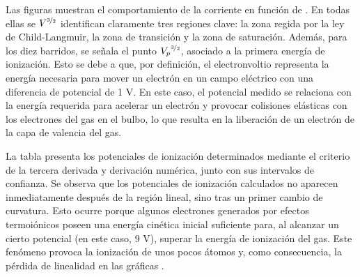 
Las figuras \ut{\ref{fig:pot1} - \ref{fig:pot10}} muestran el comportamiento de la corriente en función de . En todas ellas se $V^{\nicefrac{3}{2}}$ identifican claramente tres regiones clave: la zona regida por la ley de Child-Langmuir, la zona de transición y la zona de saturación. Además, para los diez barridos, se señala el punto ${V_{p}}^{\nicefrac{3}{2}}$, asociado a la primera energía de ionización. Esto se debe a que, por definición, el electronvoltio representa la energía necesaria para mover un electrón en un campo eléctrico con una diferencia de potencial de 1 V. En este caso, el potencial medido se relaciona con la energía requerida para acelerar un electrón y provocar colisiones elásticas con los electrones del gas en el bulbo, lo que resulta en la liberación de un electrón de la capa de valencia del gas.

La tabla \ut{\ref{tab:pots}} presenta los potenciales de ionización determinados mediante el criterio de la tercera derivada y derivación numérica, junto con sus intervalos de confianza. Se observa que los potenciales de ionización calculados no aparecen inmediatamente después de la región lineal, sino tras un primer cambio de curvatura. Esto ocurre porque algunos electrones generados por efectos termoiónicos poseen una energía cinética inicial suficiente para, al alcanzar un cierto potencial (en este caso, 9 V), superar la energía de ionización del gas. Este fenómeno provoca la ionización de unos pocos átomos y, como consecuencia, la pérdida de linealidad en las gráficas \ut{\ref{fig:pot1} - \ref{fig:pot10}}.


\onecolumngrid

